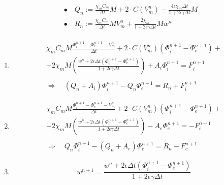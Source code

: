 \documentclass[a4paper]{article}
\theoremstyle{definition}
\begin{document}
 \begin{equation}
 \begin{gathered}
 \begin{aligned}
 & \bullet \quad Q_n := \frac{\chi_m C_m}{\Delta t}M + 2 \cdot C(V_m^n) - \frac{4\epsilon\chi_m \Delta t}{1 + 2\epsilon \gamma \Delta t} M \\
 & \bullet \quad R_n := \frac{\chi_mC_m}{\Delta t}MV_m^n + \frac{2\chi_m}{1+2\epsilon\gamma\Delta t}M w^n
 \end{aligned}
 \end{gathered}
\end{equation}

\begin{enumerate}
	\item 
	\begin{equation}
	\begin{gathered}
	\chi_m C_m M \frac{	\Phi_i^{n+1}-\Phi_e^{n+1}-V_m^{n}}{\Delta t} + 2\cdot C(V_m^n) (\Phi_i^{n+1}-\Phi_e^{n+1}) + \\ - 2 \chi_m M \left(\frac{w^n + 2\epsilon \Delta t (\Phi_i^{n+1}-\Phi_e^{n+1})}{1+2\epsilon \gamma \Delta t}   \right) + A_i \Phi_i ^{n+1} = F_i^{n+1} \\ \\
     \Rightarrow \quad (Q_n + A_i) \Phi_i^{n+1} - Q_n \Phi_e^{n+1} =R_n +  F_i^{n+1}
	\end{gathered}
	\end{equation}
	
    \item 
	\begin{equation}
	\begin{gathered}
	\chi_m C_m M \frac{	\Phi_i^{n+1}-\Phi_e^{n+1}-V_m^{n}}{\Delta t} + 2\cdot C(V_m^n) (\Phi_i^{n+1}-\Phi_e^{n+1}) + \\ - 2 \chi_m M \left(\frac{w^n + 2\epsilon \Delta t (\Phi_i^{n+1}-\Phi_e^{n+1})}{1+2\epsilon \gamma \Delta t}   \right) - A_e \Phi_e ^{n+1} = -F_e^{n+1} \\ \\
	\Rightarrow \quad Q_n \Phi_i^{n+1} - (Q_n+A_e) \Phi_e^{n+1} =R_n - F_e^{n+1}
	\end{gathered}
	\end{equation}
	\vspace{3mm}
	\item 
	\begin{equation}
	w^{n+1} = \frac{w^n + 2\epsilon \Delta t (\Phi_i^{n+1}-\Phi_e^{n+1})}{1+2\epsilon \gamma \Delta t}
	\end{equation}
\end{enumerate}
\end{document}
